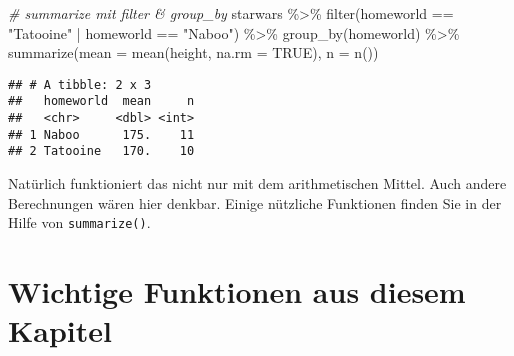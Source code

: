 \documentclass[
]{book}
\newenvironment{Shaded}{\begin{snugshade}}{\end{snugshade}}
\newcommand{\AttributeTok}[1]{\textcolor[rgb]{0.77,0.63,0.00}{#1}}
\newcommand{\CommentTok}[1]{\textcolor[rgb]{0.56,0.35,0.01}{\textit{#1}}}
\newcommand{\ConstantTok}[1]{\textcolor[rgb]{0.00,0.00,0.00}{#1}}
\newcommand{\FunctionTok}[1]{\textcolor[rgb]{0.00,0.00,0.00}{#1}}
\newcommand{\NormalTok}[1]{#1}
\newcommand{\SpecialCharTok}[1]{\textcolor[rgb]{0.00,0.00,0.00}{#1}}
\newcommand{\StringTok}[1]{\textcolor[rgb]{0.31,0.60,0.02}{#1}}
\begin{document}
\begin{Shaded}
\begin{Highlighting}[]
\CommentTok{\# summarize mit filter \& group\_by}
\NormalTok{starwars }\SpecialCharTok{\%\textgreater{}\%}
  \FunctionTok{filter}\NormalTok{(homeworld }\SpecialCharTok{==} \StringTok{"Tatooine"} \SpecialCharTok{|}\NormalTok{ homeworld }\SpecialCharTok{==} \StringTok{"Naboo"}\NormalTok{) }\SpecialCharTok{\%\textgreater{}\%} 
  \FunctionTok{group\_by}\NormalTok{(homeworld) }\SpecialCharTok{\%\textgreater{}\%} 
  \FunctionTok{summarize}\NormalTok{(}\AttributeTok{mean =} \FunctionTok{mean}\NormalTok{(height, }\AttributeTok{na.rm =} \ConstantTok{TRUE}\NormalTok{), }\AttributeTok{n =} \FunctionTok{n}\NormalTok{())}
\end{Highlighting}
\end{Shaded}

\begin{verbatim}
## # A tibble: 2 x 3
##   homeworld  mean     n
##   <chr>     <dbl> <int>
## 1 Naboo      175.    11
## 2 Tatooine   170.    10
\end{verbatim}

Natürlich funktioniert das nicht nur mit dem arithmetischen Mittel. Auch andere Berechnungen wären hier denkbar. Einige nützliche Funktionen finden Sie in der Hilfe von \texttt{summarize()}.

\hypertarget{wichtige-funktionen-aus-diesem-kapitel-1}{%
\section*{Wichtige Funktionen aus diesem Kapitel}\label{wichtige-funktionen-aus-diesem-kapitel-1}}
\end{document}
